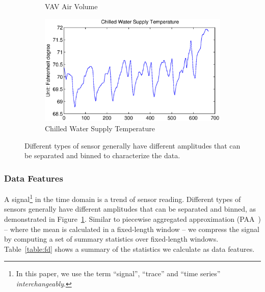 \begin{figure}[ht!]
\begin{subfigure}{0.32\textwidth}
                \caption{VAV Air Volume}
  \end{subfigure}
  \begin{subfigure}{0.32\textwidth}
                \centering
    \includegraphics[width=\textwidth]{./fig/cwt.eps}
                \caption{Chilled Water Supply Temperature}
  \end{subfigure}
\caption{Different types of sensor generally have different amplitudes that can be separated and binned to characterize the data.}
\label{fig:example}
\end{figure}

\subsubsection{Data Features}
A signal\footnote{In this paper, we use the term ``signal'', ``trace'' and ``time series'' \textit{interchangeably}.} in the time domain is a trend of sensor reading.
Different types of sensors generally have different amplitudes that can be separated and binned,
as demonstrated in Figure~\ref{fig:example}.
Similar to piecewise aggregated approximation (PAA~\cite{paa}) -- where the mean is calculated in a fixed-length window --
we compress the signal by computing a set of summary statistics over fixed-length windows.
Table~\ref{table:fd} shows a summary of the statistics we calculate as data features.


